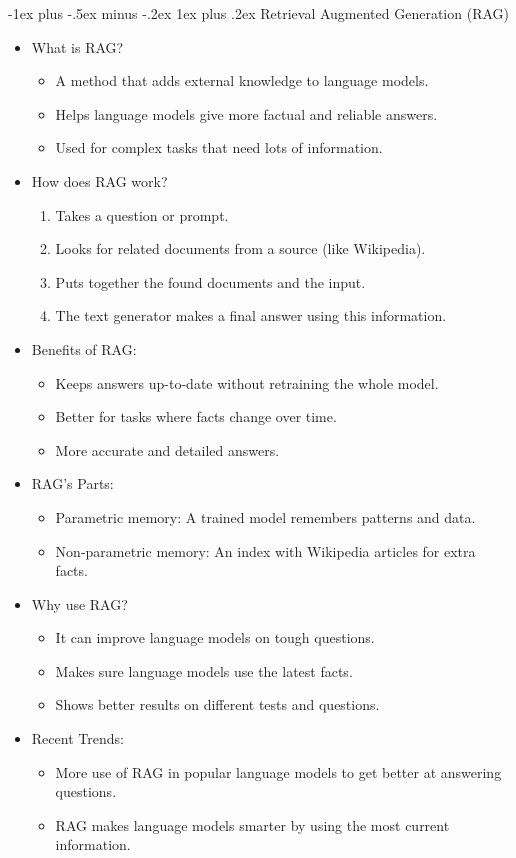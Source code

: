 \documentclass[10pt,landscape]{article}
\makeatletter
\renewcommand{\subsection}{\@startsection{subsection}{2}{0mm}%
                                {-1explus -.5ex minus -.2ex}%
                                {0.5ex plus .2ex}%
                                {\normalfont\normalsize\bfseries}}
\renewcommand{\subsection}{\@startsection{subsection}{3}{0mm}%
                                {-1ex plus -.5ex minus -.2ex}%
                                {1ex plus .2ex}%
                                {\normalfont\small\bfseries}}
\makeatother
\begin{document}
\begin{multicols}{3}
\subsection{Retrieval Augmented Generation (RAG)}
\begin{itemize}
    \item What is RAG?
    \begin{itemize}
        \item A method that adds external knowledge to language models.
        \item Helps language models give more factual and reliable answers.
        \item Used for complex tasks that need lots of information.
    \end{itemize}
    \item How does RAG work?
    \begin{enumerate}
        \item Takes a question or prompt.
        \item Looks for related documents from a source (like Wikipedia).
        \item Puts together the found documents and the input.
        \item The text generator makes a final answer using this information.
    \end{enumerate}
    \item Benefits of RAG:
    \begin{itemize}
        \item Keeps answers up-to-date without retraining the whole model.
        \item Better for tasks where facts change over time.
        \item More accurate and detailed answers.
    \end{itemize}
    \item RAG's Parts:
    \begin{itemize}
        \item Parametric memory: A trained model remembers patterns and data.
        \item Non-parametric memory: An index with Wikipedia articles for extra facts.
    \end{itemize}
    \item Why use RAG?
    \begin{itemize}
        \item It can improve language models on tough questions.
        \item Makes sure language models use the latest facts.
        \item Shows better results on different tests and questions.
    \end{itemize}
    \item Recent Trends:
    \begin{itemize}
        \item More use of RAG in popular language models to get better at answering questions.
        \item RAG makes language models smarter by using the most current information.
    \end{itemize}
\end{itemize}


\end{multicols}
\end{document}
